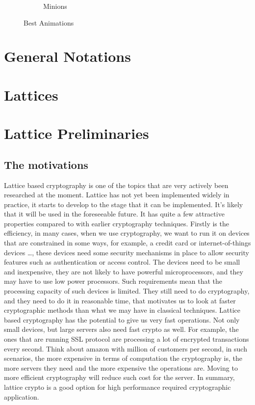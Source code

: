 \begin{landscape}
\begin{figure}
\begin{subfigure}[b]{0.3\textwidth}
    \caption{Minions}
    \label{fig:Minnion}
  \end{subfigure}
  \caption{Best Animations}
  \label{fig:animations}
\end{figure}


\end{landscape}

\section{General Notations}
\label{sec:defGeneral}

\section{Lattices}
\label{sec:defLattices}
\section{Lattice Preliminaries}
\label{sec:latice-pre}

\subsection{The motivations}
\label{ssub:The motivations}

Lattice based cryptography is one of the topics that are very actively been
researched at the moment. Lattice has not yet been implemented widely in
practice, it starts to develop to the stage that it can be implemented. It’s
likely that it will be used in the foreseeable future. It has quite a few
attractive properties compared to with earlier cryptography techniques. Firstly
is the efficiency, in many cases, when we use cryptography, we want to run it on
devices that are constrained in some ways, for example, a credit card or
internet-of-things devices \dots, these devices need some security mechanisms in
place to allow security features such as authentication or access control. The
devices need to be small and inexpensive, they are not likely to have powerful
microprocessors, and they may have to use low power processors. Such
requirements mean that the processing capacity of such devices is limited. They
still need to do cryptography, and they need to do it in reasonable time, that
motivates us to look at faster cryptographic methods than what we may have in
classical techniques. Lattice based cryptography has the potential to give us
very fast operations. Not only small devices, but large servers also need fast
crypto as well. For example, the ones that are running SSL protocol are
processing a lot of encrypted transactions every second. Think about amazon with
million of customers per second, in such scenarios, the more expensive in terms
of computation the cryptography is, the more servers they need and the more
expensive the operations are. Moving to more efficient cryptography will reduce
such cost for the server. In summary, lattice crypto is a good option for high
performance required cryptographic application.

